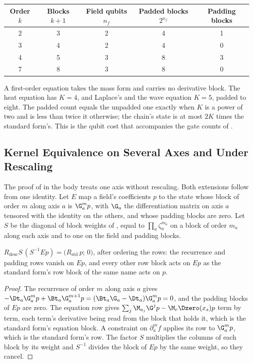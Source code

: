 \begin{center}
\begin{tabular}{ccccc}
\toprule
Order $k$ & Blocks $k+1$ & Field qubits $n_f$ & Padded blocks $2^{n_f}$ & Padding blocks \\
\midrule
2 & 3 & 2 & 4 & 1 \\
3 & 4 & 2 & 4 & 0 \\
4 & 5 & 3 & 8 & 3 \\
7 & 8 & 3 & 8 & 0 \\
\bottomrule
\end{tabular}
\end{center}

A first-order equation takes the mass form and carries no derivative block. The heat equation has $K=4$, and Laplace's and the wave equation $K=5$, padded to eight. The padded count equals the unpadded one exactly when $K$ is a power of two and is less than twice it otherwise; the chain's state is at most $2K$ times the standard form's. This is the qubit cost that accompanies the gate counts of .

\subsection{Kernel Equivalence on Several Axes and Under Rescaling}
\label{app:proof-kernel-equivalence}

The proof of  in the body treats one axis without rescaling. Both extensions follow from one identity. Let $E$ map a field's coefficients $p$ to the state whose block of order $m$ along axis $a$ is $\G_a^mp$, with $\G_a$ the differentiation matrix on axis $a$ tensored with the identity on the others, and whose padding blocks are zero. Let $S$ be the diagonal of block weights of , equal to $\prod_a\zeta_a^{m_a}$ on a block of order $m_a$ along each axis and to one on the field and padding blocks.

\begin{proposition}
\label{prop:substitution-identity}
$R_{\mathrm{desc}}S\,(S^{-1}Ep)=\bigl(R_{\mathrm{std}}\,p;\,0\bigr)$, after ordering the rows: the recurrence and padding rows vanish on $Ep$, and every other row block acts on $Ep$ as the standard form's row block of the same name acts on $p$.
\end{proposition}
\begin{proof}
The recurrence of order $m$ along axis $a$ gives $-\Dt_a\G_a^mp+\Bt_a\G_a^{m+1}p=(\Bt_a\G_a-\Dt_a)\G_a^mp=0$, and the padding blocks of $Ep$ are zero. The equation row gives $\sum_j\M_{a_j}\G^jp-\M_r\Dzero(x_s)p$ term by term, each term's derivative being read from the block that holds it, which is the standard form's equation block. A constraint on $\partial_a^mf$ applies its row to $\G_a^mp$, which is the standard form's row. The factor $S$ multiplies the columns of each block by its weight and $S^{-1}$ divides the block of $Ep$ by the same weight, so they cancel.
\end{proof}

